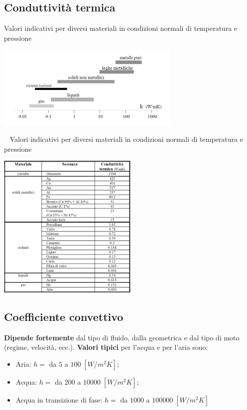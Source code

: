 \subsection{Conduttività termica}
Valori indicativi per diversi materiali in condizioni normali di temperatura e pressione
\begin{center}
    \includegraphics[height=4cm]{../L10/img12.PNG}
\end{center}
\ \newline
Valori indicativi per diversi materiali in condizioni normali di temperatura e pressione
\begin{center}
    \includegraphics[height=7cm]{../L10/img13.PNG}
\end{center}
\subsection{Coefficiente convettivo}
\textbf{Dipende fortemente} dal tipo di fluido, dalla geometrica e dal tipo di moto (regime, velocità, ecc.).\newline
\newline
\textbf{Valori tipici} per l'acqua e per l'aria sono:
\begin{itemize}
    \item Aria: $h =$ da $5$ a $100 \; [W/m^2K]$;
    \item Acqua: $h =$ da $200$ a $10000 \; [W/m^2K]$;
    \item Acqua in transizione di fase: $h =$ da $1000$ a $100000 \; [W/m^2K]$
\end{itemize}
